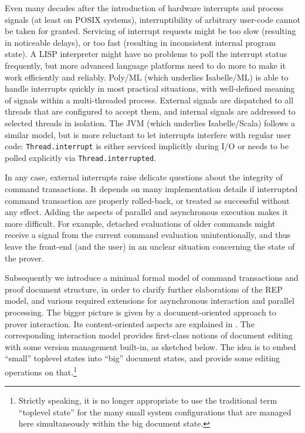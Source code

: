 \begin{isabellebody}
\begin{isamarkuptext}
  Even many decades after the introduction of hardware interrupts and
  process signals (at least on POSIX systems), interruptibility of
  arbitrary user-code cannot be taken for granted.  Servicing of
  interrupt requests might be too slow (resulting in noticeable
  delays), or too fast (resulting in inconsistent internal program
  state).  A LISP interpreter might have no problems to poll the
  interrupt status frequently, but more advanced language platforms
  need to do more to make it work efficiently and reliably.  Poly/ML
  (which underlies Isabelle/ML) is able to handle interrupts quickly
  in most practical situations, with well-defined meaning of signals
  within a multi-threaded process.  External signals are dispatched to
  all threads that are configured to accept them, and internal signals
  are addressed to selected threads in isolation.  The JVM (which
  underlies Isabelle/Scala) follows a similar model, but is more
  reluctant to let interrupts interfere with regular user code:
  \verb|Thread.interrupt| is either serviced implicitly during
  I/O or needs to be polled explicitly via \verb|Thread.interrupted|.

  In any case, external interrupts raise delicate questions about the
  integrity of command transactions.  It depends on many
  implementation details if interrupted command transaction are
  properly rolled-back, or treated as successful without any effect.
  Adding the aspects of parallel and asynchronous execution makes it
  more difficult.  For example, detached evaluations of older commands
  might receive a signal from the current command evaluation
  unintentionally, and thus leave the front-end (and the user) in an
  unclear situation concerning the state of the prover.%
\end{isamarkuptext}%
\isamarkuptrue%
%
\isamarkuptrue%
%
\begin{isamarkuptext}%
Subsequently we introduce a minimal formal model of command
  transactions and proof document structure, in order to clarify
  further elaborations of the REP model, and various required
  extensions for asynchronous interaction and parallel processing.
  The bigger picture is given by a document-oriented approach to
  prover interaction.  Its content-oriented aspects are explained in
  \cite{Wenzel:2011:CICM}.  The corresponding interaction model
  provides first-class notions of document editing with some version
  management built-in, as sketched below.  The idea is to embed
  ``small'' toplevel states into ``big'' document states, and provide
  some editing operations on that.\footnote{Strictly speaking, it is
  no longer appropriate to use the traditional term ``toplevel state''
  for the many small system configurations that are managed here
  simultaneously within the big document state.}


\end{isamarkuptext}
\end{isabellebody}
